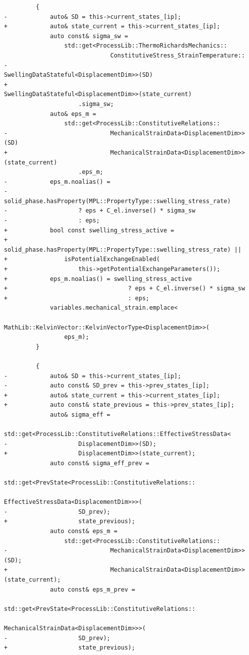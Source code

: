 \documentclass[10pt]{article}
\begin{document}
\begin{lstlisting}
         {
-            auto& SD = this->current_states_[ip];
+            auto& state_current = this->current_states_[ip];
             auto const& sigma_sw =
                 std::get<ProcessLib::ThermoRichardsMechanics::
                              ConstitutiveStress_StrainTemperature::
-                                 SwellingDataStateful<DisplacementDim>>(SD)
+                                 SwellingDataStateful<DisplacementDim>>(state_current)
                     .sigma_sw;
             auto& eps_m =
                 std::get<ProcessLib::ConstitutiveRelations::
-                             MechanicalStrainData<DisplacementDim>>(SD)
+                             MechanicalStrainData<DisplacementDim>>(state_current)
                     .eps_m;
-            eps_m.noalias() =
-                solid_phase.hasProperty(MPL::PropertyType::swelling_stress_rate)
-                    ? eps + C_el.inverse() * sigma_sw
-                    : eps;
+            bool const swelling_stress_active =
+                solid_phase.hasProperty(MPL::PropertyType::swelling_stress_rate) ||
+                isPotentialExchangeEnabled(
+                    this->getPotentialExchangeParameters());
+            eps_m.noalias() = swelling_stress_active
+                                  ? eps + C_el.inverse() * sigma_sw
+                                  : eps;
             variables.mechanical_strain.emplace<
                 MathLib::KelvinVector::KelvinVectorType<DisplacementDim>>(
                 eps_m);
         }
 
         {
-            auto& SD = this->current_states_[ip];
-            auto const& SD_prev = this->prev_states_[ip];
+            auto& state_current = this->current_states_[ip];
+            auto const& state_previous = this->prev_states_[ip];
             auto& sigma_eff =
                 std::get<ProcessLib::ConstitutiveRelations::EffectiveStressData<
-                    DisplacementDim>>(SD);
+                    DisplacementDim>>(state_current);
             auto const& sigma_eff_prev =
                 std::get<PrevState<ProcessLib::ConstitutiveRelations::
                                        EffectiveStressData<DisplacementDim>>>(
-                    SD_prev);
+                    state_previous);
             auto const& eps_m =
                 std::get<ProcessLib::ConstitutiveRelations::
-                             MechanicalStrainData<DisplacementDim>>(SD);
+                             MechanicalStrainData<DisplacementDim>>(state_current);
             auto const& eps_m_prev =
                 std::get<PrevState<ProcessLib::ConstitutiveRelations::
                                        MechanicalStrainData<DisplacementDim>>>(
-                    SD_prev);
+                    state_previous);
 

\end{lstlisting}
\end{document}
